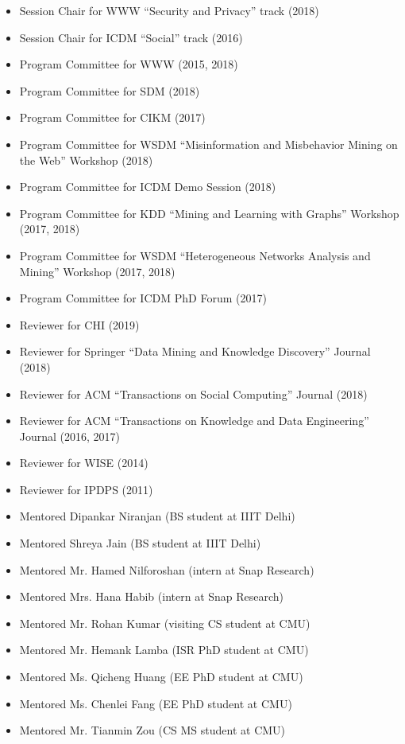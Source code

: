 \documentclass{article}
\begin{document}
\begin{itemize}
  \item Session Chair for WWW ``Security and Privacy'' track (2018)
  \item Session Chair for ICDM ``Social'' track (2016)
  \item Program Committee for WWW (2015, 2018)
  \item Program Committee for SDM (2018)
  \item Program Committee for CIKM (2017)
   \item Program Committee for WSDM ``Misinformation and Misbehavior Mining on the Web'' Workshop (2018)
    \item Program Committee for  ICDM Demo Session (2018)
   \item Program Committee for KDD ``Mining and Learning with Graphs'' Workshop (2017, 2018)
 \item Program Committee for WSDM ``Heterogeneous Networks Analysis and Mining'' Workshop (2017, 2018)
 \item Program Committee for  ICDM PhD Forum (2017)
 \item Reviewer for CHI (2019)
 \item Reviewer for Springer ``Data Mining and Knowledge Discovery'' Journal (2018)
 \item Reviewer for ACM ``Transactions on Social Computing'' Journal (2018)
 \item Reviewer for ACM ``Transactions on Knowledge and Data Engineering'' Journal (2016, 2017)
 \item Reviewer for WISE (2014)
 \item Reviewer for IPDPS (2011)
 \item Mentored Dipankar Niranjan (BS student at IIIT Delhi)
 \item Mentored Shreya Jain (BS student at IIIT Delhi)
 \item Mentored Mr. Hamed Nilforoshan (intern at Snap Research)
 \item Mentored Mrs. Hana Habib (intern at Snap Research) 
 \item Mentored Mr. Rohan Kumar (visiting CS student at CMU)
 \item Mentored Mr. Hemank Lamba (ISR PhD student at CMU)
 \item Mentored Ms. Qicheng Huang (EE PhD student at CMU)
 \item Mentored Ms. Chenlei Fang (EE PhD student at CMU)
 \item Mentored Mr. Tianmin Zou (CS MS student at CMU)
\end{itemize}
\end{document}
